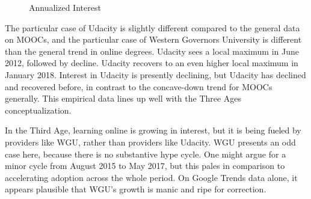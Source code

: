 \documentclass[review]{elsarticle}
\begin{document}
\begin{figure}[h!]
    \centering
    \caption{Annualized Interest}


    \label{fig:google_trends_digital_education}
\end{figure}

The particular case of Udacity is slightly different compared to the general data on MOOCs,
and the particular case of Western Governors University is different than the general trend in online degrees.
Udacity sees a local maximum in June 2012, followed by decline.
Udacity recovers to an even higher local maximum in January 2018.
Interest in Udacity is presently declining, but Udacity has declined and recovered before,
in contrast to the concave-down trend for MOOCs generally.
This empirical data lines up well with the Three Ages conceptualization.

In the Third Age, learning online is growing in interest, but it is being fueled by providers
like WGU, rather than providers like Udacity.
WGU presents an odd case here, because there is no substantive hype cycle.
One might argue for a minor cycle from August 2015 to May 2017, but this pales in comparison to accelerating adoption across the whole period.
On Google Trends data alone, it appears plausible that WGU's growth is manic and ripe for correction.
\end{document}
